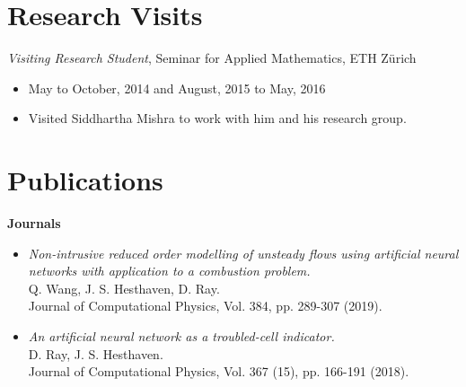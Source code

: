\documentclass[margin]{res}
\begin{document}
\begin{resume}
% 

\section{Research Visits}
 {\it Visiting Research Student}, Seminar for Applied Mathematics, ETH Z\"{u}rich
 \begin{itemize} \itemsep -2pt  %
 \item May to October, 2014 and August, 2015 to May, 2016            
 \item Visited Siddhartha Mishra to work with him and his research group.
 \end{itemize}
 
 \newpage

 \section{Publications}

\textbf{Journals}                
            \begin{itemize}            
            
            \item {\it Non-intrusive reduced order modelling of unsteady flows using artificial neural networks with application to a combustion problem.} \\
              Q. Wang, J. S. Hesthaven, D. Ray.\\
              Journal of Computational Physics, Vol. 384, pp. 289-307 (2019).
            
           \item {\it An artificial neural network as a troubled-cell indicator.}\\
            D. Ray, J. S. Hesthaven.\\
            Journal of Computational Physics, Vol. 367 (15), pp. 166-191 (2018).


\end{itemize}
\end{resume}
\end{document}
